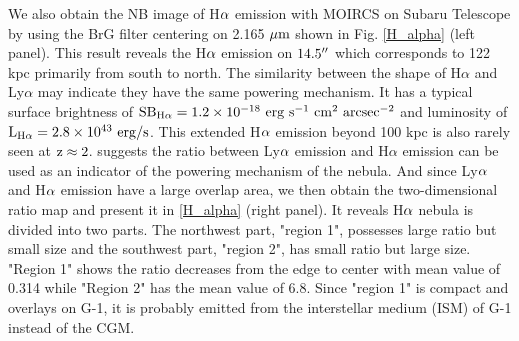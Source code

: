 \documentclass[../Results.tex]{subfiles}
\begin{document}
We also obtain the NB image of H$\rm \alpha$ emission with MOIRCS on Subaru Telescope by using the BrG filter centering on 2.165 $\rm \mu m$ shown in Fig. \ref{H_alpha} (left panel). This result reveals the H$\rm \alpha$ emission on $\rm 14.5\mbox{$^{\prime\prime}$}$ which corresponds to 122 kpc primarily from south to north. The similarity between the shape of H$\alpha$ and Ly$\alpha$ may indicate they have the same powering mechanism. It has a typical surface brightness of $\rm SB_{H\alpha}=1.2 \times 10^{-18} \ erg \ s^{-1} \ cm^{2} \ arcsec^{-2}$ and luminosity of $\rm L_{H\alpha}=2.8 \times 10^{43} \ erg/s$. This extended H$\rm \alpha$ emission beyond 100 kpc is also rarely seen at $\rm z \approx 2$. \citet{Leibler_2018} suggests the ratio between Ly$\rm \alpha$ emission and H$\alpha$ emission can be used as an indicator of the powering mechanism of the nebula. And since Ly$\rm \alpha$ and H$\rm \alpha$ emission have a large overlap area, we then obtain the two-dimensional ratio map and present it in \ref{H_alpha} (right panel). It reveals H$\rm \alpha$ nebula is divided into two parts. The northwest part, "region 1", possesses large ratio but small size and the southwest part, "region 2", has small ratio but large size. "Region 1" shows the ratio decreases from the edge to center with mean value of 0.314 while "Region 2" has the mean value of 6.8. Since "region 1" is compact and overlays on G-1, it is probably emitted from the interstellar medium (ISM) of G-1 instead of the CGM. 
\end{document}
